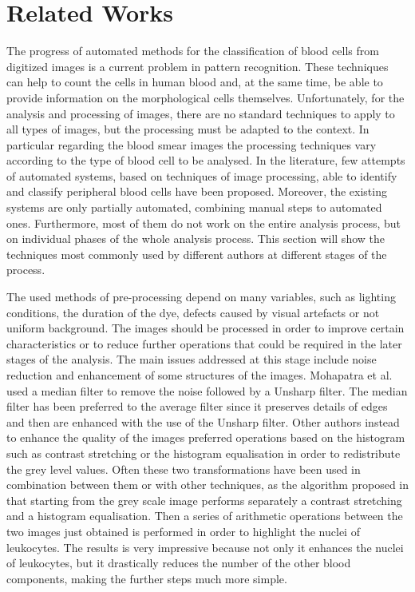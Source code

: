 \documentclass[final,a4paper,12pt,english]{UnicaPhdThesis3}
\begin{document}
	\section {Related Works}
	The progress of automated methods for the classification of blood cells from digitized images is a current problem in pattern recognition. These techniques can help to count the cells in human blood and, at the same time, be able to provide information on the morphological cells themselves. Unfortunately, for the analysis and processing of images, there are no standard techniques to apply to all types of images, but the processing must be adapted to the context. In particular regarding the blood smear images the processing techniques vary according to the type of blood cell to be analysed. In the literature, few attempts of automated systems, based on techniques of image processing, able to identify and classify peripheral blood cells have been proposed. Moreover, the existing systems are only partially automated, combining manual steps to automated ones. Furthermore, most of them do not work on the entire analysis process, but on individual phases of the whole analysis process. This section will show the techniques most commonly used by different authors at different stages of the process. 
	
	The used methods of pre-processing depend on many variables, such as lighting conditions, the duration of the dye, defects caused by visual artefacts or not uniform background. The images should be processed in order to improve certain characteristics or to reduce further operations that could be required in the later stages of the analysis. The main issues addressed at this stage include noise reduction and enhancement of some structures of the images. Mohapatra et al. \cite{Mohapatra10a,Mohapatra10b,Mohapatra10c,Mohapatra14} used a median filter to remove the noise followed by a Unsharp filter. The median filter has been preferred to the average filter since it preserves details of edges and then are enhanced with the use of the Unsharp filter. Other authors instead to enhance the quality of the images preferred operations based on the histogram such as contrast stretching or the histogram equalisation in order to redistribute the grey level values. Often these two transformations have been used in combination between them or with other techniques, as the algorithm proposed in \cite{Madhloom} that starting from the grey scale image performs separately a contrast stretching and a histogram equalisation. Then a series of arithmetic operations between the two images just obtained is performed in order to highlight the nuclei of leukocytes. The results is very impressive because not only it
	enhances the nuclei of leukocytes, but it drastically reduces the number of the other blood components, making the further steps much more simple.
	
\end{document}
